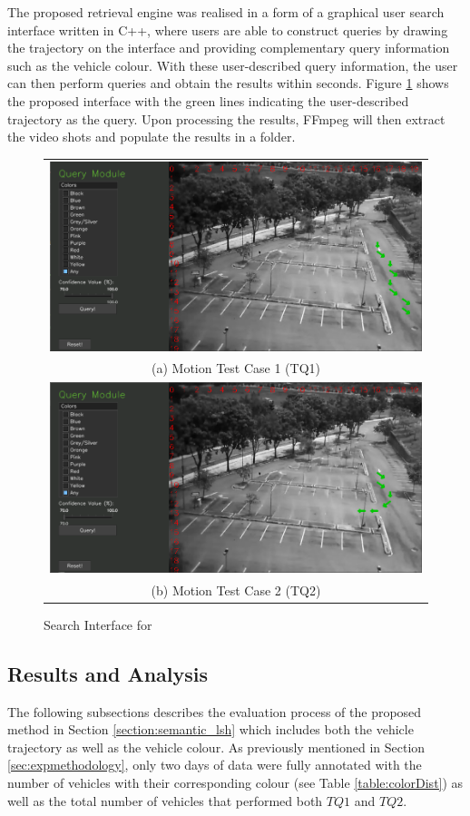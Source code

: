 The proposed retrieval engine was realised in a form of a graphical user search interface written in C++, where users are able to construct queries by drawing the trajectory on the interface and providing complementary query information such as the vehicle colour. With these user-described query information, the user can then perform queries and obtain the results within seconds. Figure \ref{fig:versionOneInterface} shows the proposed interface with the green lines indicating the user-described trajectory as the query. Upon processing the results, FFmpeg will then extract the video shots and populate the results in a folder.





\begin{figure}[!htb]
	\centering
	\begin{tabular}{c}
		\includegraphics[width=0.7\linewidth]{image/retrievalOne/test1-8inputs.PNG} \\
		(a) Motion Test Case 1 (TQ1) \\
		\includegraphics[width=0.7\linewidth]{image/retrievalOne/test2-6input.PNG}\\
		(b) Motion Test Case 2 (TQ2)
	\end{tabular}
	\caption{Search Interface for \versionOneRet}
	\label{fig:versionOneInterface}
\end{figure}




\subsection{Results and Analysis}
The following subsections describes the evaluation process of the proposed method in Section \ref{section:semantic_lsh} which includes both the vehicle trajectory as well as the vehicle colour. As previously mentioned in Section \ref{sec:expmethodology}, only two days of data were fully annotated with the number of vehicles with their corresponding colour (see Table \ref{table:colorDist}) as well as the total number of vehicles that performed both $TQ1$ and $TQ2$.

